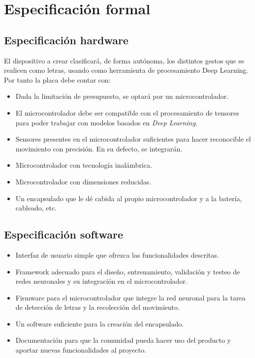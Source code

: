 \section{Especificación formal}

\subsection{Especificación hardware\label{reqHW}}
El dispositivo a crear clasificará, de forma autónoma, los distintos
gestos que se realicen
como letras, usando como herramienta de procesamiento Deep Learning.
Por tanto la placa debe contar con:
\begin{itemize}
    \itemsep0em
    \item Dada la limitación de presupuesto, se optará por un microcontrolador.
    \item El microcontrolador debe ser compatible con el procesamiento de
    tensores para poder trabajar con modelos basados en \textit{Deep Learning}.
    \item Sensores presentes en el microcontrolador suficientes para hacer
    reconocible el movimiento con precisión. En su defecto, se integrarán.
    \item Microcontrolador con tecnología inalámbrica.
    \item Microcontrolador con dimensiones reducidas.
    \item Un encapsulado que le dé cabida al propio microcontrolador
    y a la batería, cableado, etc.
\end{itemize}

\subsection{Especificación software}
\begin{itemize}
    \itemsep0em
    \item Interfaz de usuario simple que ofrezca las funcionalidades
    descritas.
    \item Framework adecuado para el diseño, entrenamiento, validación y testeo
    de redes neuronales y su integración en el microcontrolador.
    \item Firmware para el microcontrolador que integre la red neuronal
    para la tarea de detección de letras y la recolección del movimiento.
    \item Un software suficiente para la creación del encapsulado.
    \item Documentación para que la comunidad pueda hacer uso del producto
    y aportar nuevas funcionalidades al proyecto.
\end{itemize}


